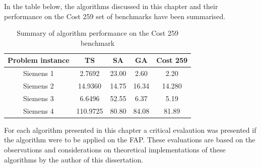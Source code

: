 In the table below, the algorithms discussed in this chapter and their performance on the Cost 259 set of benchmarks have been summarised.\\
\begin{table}[h]
\label{tbl:summaryMetaTable}
\begin{center}
	\begin{tabular}{| c | c | c | c | c |}
	\hline
	Problem instance & TS & SA & GA & Cost 259 \\ \hline
	Siemens 1 & 2.7692 & 23.00 & 2.60 & 2.20 \\ \hline
	Siemens 2 & 14.9360 & 14.75 & 16.34 & 14.280 \\ \hline
	Siemens 3 & 6.6496 & 52.55 & 6.37 & 5.19 \\ \hline
	Siemens 4 & 110.9725 & 80.80 & 84.08 & 81.89 \\ \hline
	\end{tabular}
\caption{Summary of algorithm performance on the Cost 259 benchmark}
\end{center}
\end{table}

For each algorithm presented in this chapter a critical evalaution was presented if the algorithm were to be applied on the FAP. These evaluations are based on the observations and considerations on theoretical implementations of these algorithms by the author of this dissertation.
